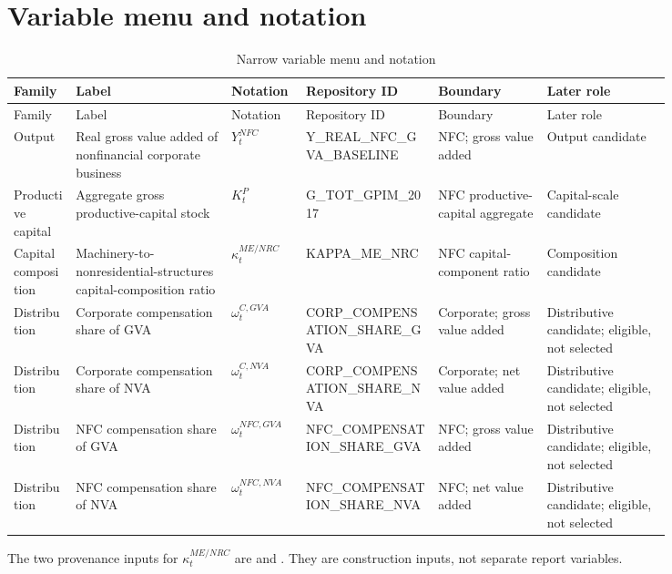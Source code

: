 \documentclass[11pt]{article}
\newcommand{\code}[1]{\texttt{\detokenize{#1}}}
\begin{document}
\section{Variable menu and notation}
\setcounter{table}{0}
\begin{landscape}
\begin{center}
\tiny
\begin{longtable}{p{0.08\linewidth}p{0.20\linewidth}p{0.09\linewidth}p{0.17\linewidth}p{0.14\linewidth}p{0.16\linewidth}}
\caption{Narrow variable menu and notation}\label{tab:variables}\\
\toprule
Family & Label & Notation & Repository ID & Boundary & Later role \\
\midrule
\endfirsthead
\toprule
Family & Label & Notation & Repository ID & Boundary & Later role \\
\midrule
\endhead
Output & Real gross value added of nonfinancial corporate business & $Y_t^{NFC}$ & Y\_\allowbreak{}REAL\_\allowbreak{}NFC\_\allowbreak{}GVA\_\allowbreak{}BASELINE & NFC; gross value added & Output candidate \\
Productive capital & Aggregate gross productive-capital stock & $K_t^{P}$ & G\_\allowbreak{}TOT\_\allowbreak{}GPIM\_\allowbreak{}2017 & NFC productive-capital aggregate & Capital-scale candidate \\
Capital composition & Machinery-to-nonresidential-structures capital-composition ratio & $\kappa_t^{ME/NRC}$ & KAPPA\_\allowbreak{}ME\_\allowbreak{}NRC & NFC capital-component ratio & Composition candidate \\
Distribution & Corporate compensation share of GVA & $\omega_t^{C,GVA}$ & CORP\_\allowbreak{}COMPENSATION\_\allowbreak{}SHARE\_\allowbreak{}GVA & Corporate; gross value added & Distributive candidate; eligible, not selected \\
Distribution & Corporate compensation share of NVA & $\omega_t^{C,NVA}$ & CORP\_\allowbreak{}COMPENSATION\_\allowbreak{}SHARE\_\allowbreak{}NVA & Corporate; net value added & Distributive candidate; eligible, not selected \\
Distribution & NFC compensation share of GVA & $\omega_t^{NFC,GVA}$ & NFC\_\allowbreak{}COMPENSATION\_\allowbreak{}SHARE\_\allowbreak{}GVA & NFC; gross value added & Distributive candidate; eligible, not selected \\
Distribution & NFC compensation share of NVA & $\omega_t^{NFC,NVA}$ & NFC\_\allowbreak{}COMPENSATION\_\allowbreak{}SHARE\_\allowbreak{}NVA & NFC; net value added & Distributive candidate; eligible, not selected \\
\bottomrule
\end{longtable}
\normalsize
\end{center}
\end{landscape}
The two provenance inputs for $\kappa_t^{ME/NRC}$ are \code{G_ME_GPIM_2017} and \code{G_NRC_GPIM_2017}. They are construction inputs, not separate report variables.
\end{document}

